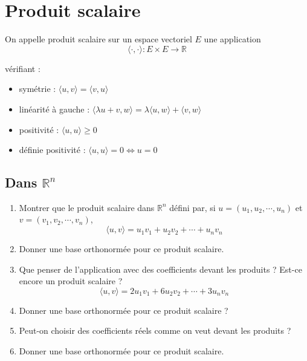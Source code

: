 \section*{Produit scalaire}

On appelle produit scalaire sur un espace vectoriel $E$ une application
$$\langle \cdot, \cdot \rangle : E \times E \to \mathbb{R}$$

vérifiant :
\begin{itemize}
\item symétrie : $\langle u, v \rangle = \langle v, u \rangle$
\item linéarité à gauche : $\langle \lambda u + v, w \rangle = \lambda \langle u, w \rangle + \langle v, w \rangle$
\item positivité : $\langle u, u \rangle \geq 0$
\item définie positivité : $\langle u, u \rangle = 0 \iff u = 0$
\end{itemize}

\subsection{Dans $\mathbb{R}^n$}
\begin{enumerate}
\item Montrer que le produit scalaire dans $\mathbb{R}^n$ défini par, si $u=(u_1, u_2, \cdots, u_n)$ et $v=(v_1, v_2, \cdots, v_n)$,
$$\langle u, v \rangle = u_1 v_1 + u_2 v_2 + \cdots + u_n v_n$$
\item Donner une base orthonormée pour ce produit scalaire. 
\item Que penser de l'application avec des coefficients devant les produits ? Est-ce encore un produit scalaire ? 
$$\langle u, v \rangle = 2u_1 v_1 + 6u_2 v_2 + \cdots + 3u_n v_n$$
\item Donner une base orthonormée pour ce produit scalaire ? 
\item Peut-on choisir des coefficients réels comme on veut devant les produits ?
\item Donner une base orthonormée pour ce produit scalaire. 
\end{enumerate}

